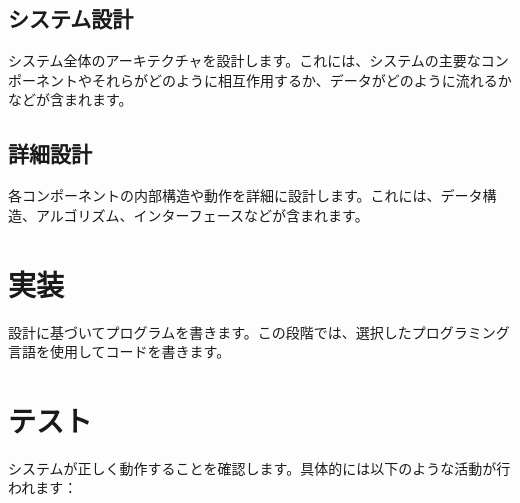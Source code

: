 \section{システム設計}
システム全体のアーキテクチャを設計します。これには、システムの主要なコンポーネントやそれらがどのように相互作用するか、データがどのように流れるかなどが含まれます。




\section{詳細設計}
各コンポーネントの内部構造や動作を詳細に設計します。これには、データ構造、アルゴリズム、インターフェースなどが含まれます。



\chapter{実装}
設計に基づいてプログラムを書きます。この段階では、選択したプログラミング言語を使用してコードを書きます。



\chapter{テスト}
システムが正しく動作することを確認します。具体的には以下のような活動が行われます：




